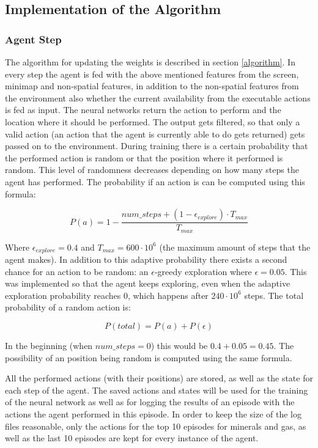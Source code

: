 \documentclass{article}
\begin{document}
\subsection{Implementation of the Algorithm}
\subsubsection{Agent Step}
The algorithm for updating the weights is described in section \ref{algorithm}. 
In every step the agent is fed with the above mentioned features from the 
screen, minimap and non-spatial features, in addition to the non-spatial 
features from the environment also whether the current availability from the 
executable actions is fed as input. The neural networks return the action to 
perform and the location where it should be performed. The output gets 
filtered, so that only a valid action (an action that the agent is currently 
able to do gets returned) gets passed on to the environment. During training 
there is a certain probability that the performed action is random or that the 
position where it performed is random. This level of randomness decreases 
depending on how many steps the agent has performed. The probability if an 
action is can be computed using this formula: 

\begin{equation}
P(a) = 1 - \frac{num\_steps + (1 - \epsilon_{explore}) \cdot 
T_{max}}{T_{max}}
\end{equation}

Where $\epsilon_{explore} = 0.4$ and $T_{max} = 600 \cdot 
10^6$ (the maximum amount of steps that the agent makes). In addition to this 
adaptive probability there exists a second chance for an action to be random: 
an $\epsilon$-greedy exploration where $\epsilon = 0.05$. This was implemented 
so that the agent keeps exploring, even when the adaptive exploration 
probability reaches $0$, which happens after $240 \cdot 10^6$ steps. The total 
probability of a random action is:

\begin{equation}
P(total) = P(a) + P(\epsilon)
\end{equation}

In the beginning (when $num\_steps = 0$) this would be $0.4 + 0.05 = 0.45$. The 
possibility of an position being random is computed using the same formula.

All the performed actions (with their positions) are stored, as well as the 
state for each step of the agent. The saved actions and states will be used for 
the training of the neural network as well as for logging the results of an 
episode with the actions the agent performed in this episode. In order to keep 
the size of the log files reasonable, only the actions for the top 10 episodes 
for minerals and gas, as well as the last 10 episodes are kept for every 
instance of the agent.
\end{document}
